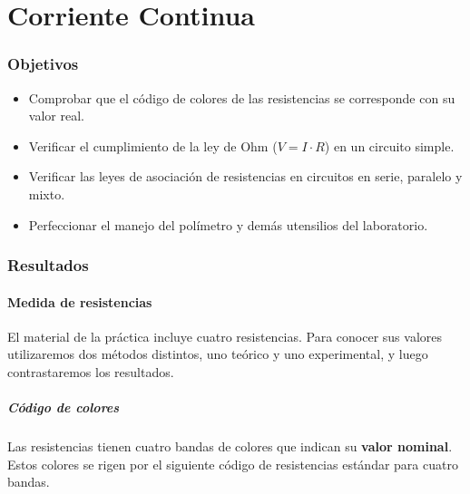 \documentclass[12pt, a4paper, titlepage]{article}
\begin{document}
  \newpage
  \part{Corriente Continua}

  \section{Objetivos}
  \begin{itemize}[label=$-$]
    \item Comprobar que el código de colores de las resistencias se corresponde con su valor real.
    \item Verificar el cumplimiento de la ley de Ohm ($V = I\cdot R$) en un circuito simple.
    \item Verificar las leyes de asociación de resistencias en circuitos en serie, paralelo y mixto.
    \item Perfeccionar el manejo del polímetro y demás utensilios del laboratorio.
  \end{itemize}


  \section{Resultados}


  \subsection{Medida de resistencias}
  El material de la práctica incluye cuatro resistencias. Para conocer sus valores utilizaremos dos métodos distintos, uno teórico y uno experimental, y luego contrastaremos los resultados.

  \subsubsection{Código de colores}
  Las resistencias tienen cuatro bandas de colores que indican su \textbf{valor nominal}. Estos colores se rigen por el siguiente código de resistencias estándar para cuatro bandas.
\end{document}
